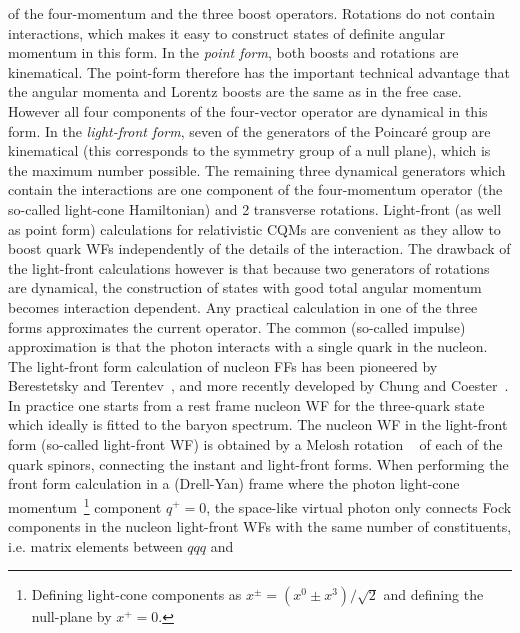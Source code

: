 of the four-momentum and the three boost operators.  
Rotations do not contain interactions, which makes it 
easy to construct states of definite angular momentum in this form. 
\newline
\indent
In the {\it point form}, both boosts and rotations are kinematical. 
The point-form therefore has the important 
technical advantage that the angular momenta and Lorentz boosts are the same 
as in the free case. However all four components of the four-vector operator 
are dynamical in this form.  
\newline
\indent
In the {\it light-front form}, seven of the generators of the Poincar\'e 
group are kinematical (this corresponds to the symmetry group of a 
null plane), which is the maximum number possible. The 
remaining three dynamical generators which contain the interactions 
are one component of the four-momentum operator (the so-called light-cone 
Hamiltonian) and 2 transverse 
rotations. Light-front (as well as point form) calculations 
for relativistic CQMs are convenient as they allow to boost 
quark WFs independently 
of the details of the interaction. The drawback of the light-front 
calculations however is that because two generators 
of rotations are dynamical, the construction of states with good 
total angular momentum becomes interaction dependent. 
\newline 
 \indent
Any practical calculation in one of the three forms approximates the 
current operator. The common (so-called impulse) approximation 
is that the photon 
interacts with a single quark in the nucleon. 
\newline
\indent
The light-front form calculation of nucleon FFs has been pioneered by 
Berestetsky and Terentev~\cite{Berestetsky}, and more recently developed  
by Chung and Coester~\cite{chung}. In practice one starts from a 
rest frame nucleon WF for the three-quark state which ideally 
is fitted to the baryon spectrum. The nucleon WF 
in the light-front form (so-called light-front WF) is obtained by 
a Melosh rotation ~\cite{Melosh:1974cu} 
of each of the quark spinors, connecting the instant and light-front forms.  
When performing the front form calculation in a (Drell-Yan) 
frame where the photon light-cone 
momentum~\footnote{Defining light-cone components as 
$x^\pm = (x^0 \pm x^3)/\sqrt{2}$ and defining the null-plane by $x^+ = 0$.} 
component $q^+ = 0$, the space-like virtual photon 
only connects Fock components in the nucleon light-front WFs with 
the same number of constituents, i.e. matrix elements between $qqq$ and 
